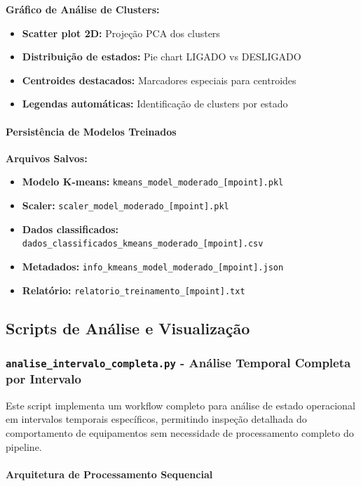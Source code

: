 \textbf{Gráfico de Análise de Clusters:}
\begin{itemize}
    \item \textbf{Scatter plot 2D:} Projeção PCA dos clusters
    \item \textbf{Distribuição de estados:} Pie chart LIGADO vs DESLIGADO
    \item \textbf{Centroides destacados:} Marcadores especiais para centroides
    \item \textbf{Legendas automáticas:} Identificação de clusters por estado
\end{itemize}

\paragraph{Persistência de Modelos Treinados}

\textbf{Arquivos Salvos:}
\begin{itemize}
    \item \textbf{Modelo K-means:} \texttt{kmeans\_model\_moderado\_[mpoint].pkl}
    \item \textbf{Scaler:} \texttt{scaler\_model\_moderado\_[mpoint].pkl}
    \item \textbf{Dados classificados:} \texttt{dados\_classificados\_kmeans\_moderado\_[mpoint].csv}
    \item \textbf{Metadados:} \texttt{info\_kmeans\_model\_moderado\_[mpoint].json}
    \item \textbf{Relatório:} \texttt{relatorio\_treinamento\_[mpoint].txt}
\end{itemize}

\subsection{Scripts de Análise e Visualização}

\subsubsection{\texttt{analise\_intervalo\_completa.py} - Análise Temporal Completa por Intervalo}

Este script implementa um workflow completo para análise de estado operacional em intervalos temporais específicos, permitindo inspeção detalhada do comportamento de equipamentos sem necessidade de processamento completo do pipeline.

\paragraph{Arquitetura de Processamento Sequencial}

